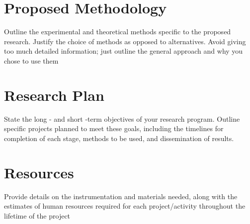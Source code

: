 \documentclass{article}
\begin{document}
\section{Proposed Methodology}
Outline the experimental and theoretical methods specific to the proposed research. Justify the choice of methods as opposed to alternatives. Avoid giving too much detailed information; just outline the general approach and why you chose to use them

\section{Research Plan}
State the long - and short -term objectives of your research program. Outline specific projects planned to meet these goals, including the timelines for completion of each stage, methods to be used, and dissemination of results. 

\section{Resources}
Provide details on the instrumentation and materials needed, along with the estimates of human resources required for each project/activity throughout the lifetime of the project



\end{document}
